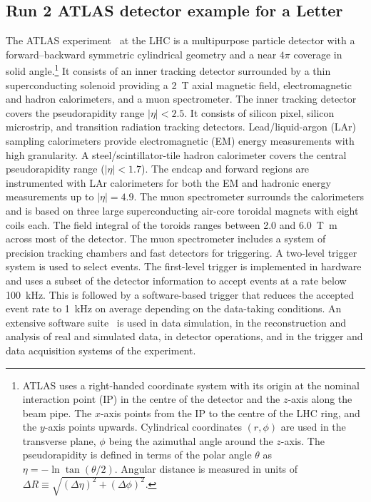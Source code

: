 \newcommand{\AtlasCoordFootnote}{%
ATLAS uses a right-handed coordinate system with its origin at the nominal interaction point (IP)
in the centre of the detector and the \(z\)-axis along the beam pipe.
The \(x\)-axis points from the IP to the centre of the LHC ring,
and the \(y\)-axis points upwards.
Cylindrical coordinates \((r,\phi)\) are used in the transverse plane, 
\(\phi\) being the azimuthal angle around the \(z\)-axis.
The pseudorapidity is defined in terms of the polar angle \(\theta\) as \(\eta = -\ln \tan(\theta/2)\).
Angular distance is measured in units of \(\Delta R \equiv \sqrt{(\Delta\eta)^{2} + (\Delta\phi)^{2}}\).}

\subsection{Run 2 ATLAS detector example for a Letter}
\label{sec:atlas2a}

The ATLAS experiment~\cite{PERF-2007-01} at the LHC is a multipurpose particle detector
with a forward--backward symmetric cylindrical geometry and a near \(4\pi\) coverage in 
solid angle.\footnote{\AtlasCoordFootnote}
It consists of an inner tracking detector surrounded by a thin superconducting solenoid
providing a \qty{2}{\tesla} axial magnetic field, electromagnetic and hadron calorimeters, and a muon spectrometer.
The inner tracking detector covers the pseudorapidity range \(|\eta| < 2.5\).
It consists of silicon pixel, silicon microstrip, and transition radiation tracking detectors.
Lead/liquid-argon (LAr) sampling calorimeters provide electromagnetic (EM) energy measurements
with high granularity.
A steel/scintillator-tile hadron calorimeter covers the central pseudorapidity range (\(|\eta| < 1.7\)).
The endcap and forward regions are instrumented with LAr calorimeters
for both the EM and hadronic energy measurements up to \(|\eta| = 4.9\).
The muon spectrometer surrounds the calorimeters and is based on
three large superconducting air-core toroidal magnets with eight coils each.
The field integral of the toroids ranges between \num{2.0} and \qty{6.0}{\tesla\metre}
across most of the detector. 
The muon spectrometer includes a system of precision tracking chambers and fast detectors for triggering.
A two-level trigger system is used to select events.
The first-level trigger is implemented in hardware and uses a subset of the detector information
to accept events at a rate below \qty{100}{\kHz}.
This is followed by a software-based trigger that
reduces the accepted event rate to \qty{1}{\kHz} on average
depending on the data-taking conditions.
An extensive software suite~\cite{ATL-SOFT-PUB-2021-001} is used in data simulation, in the reconstruction
and analysis of real and simulated data, in detector operations, and in the trigger and data acquisition
systems of the experiment.


